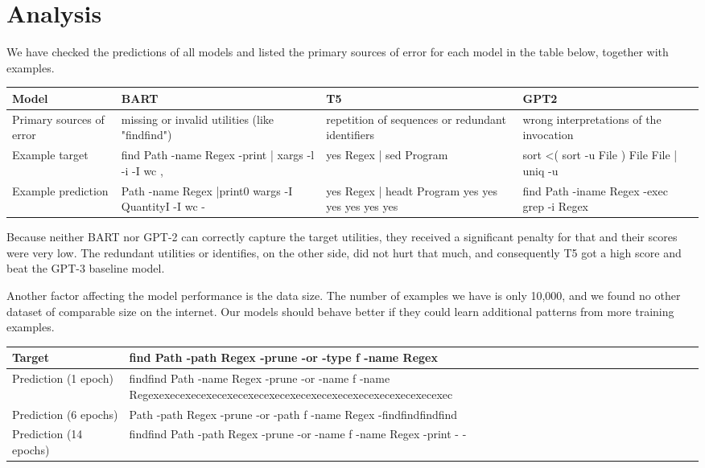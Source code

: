 \section{Analysis}
We have checked the predictions of all models and listed the primary sources of error for each model in the table below, together with examples.


\begin{center}
\begin{tabular}{ |M|L|L|L| } 
  \hline
  Model & BART & T5 & GPT2 \\ 
  \hline
  Primary sources of error & 
  missing or invalid utilities (like "findfind") & 
  repetition of sequences or redundant identifiers & 
  wrong interpretations of the invocation\\ 
  \hline
  Example target & find Path -name Regex -print | xargs -l -i -I {} wc {} {}, & 
  yes Regex | sed Program &
  sort <( sort -u File ) File File | uniq -u \\ 
  \hline
  Example prediction & 
  Path -name Regex |print0 wargs -I QuantityI -I {} wc - & yes Regex | headt Program yes yes yes yes yes yes & 
  find Path -iname Regex -exec grep -i Regex {}\\
  \hline
\end{tabular}
\end{center}

Because neither BART nor GPT-2 can correctly capture the target utilities, they received a significant penalty for that and their scores were very low. The redundant utilities or identifies, on the other side, did not hurt that much, and consequently T5 got a high score and beat the GPT-3 baseline model.

Another factor affecting the model performance is the data size. The number of examples we have is only 10,000, and we found no other dataset of comparable size on the internet. Our models should behave better if they could learn additional patterns from more training examples.

\begin{center}
\begin{tabular}{|M|N|}
    \hline
     Target&  find Path -path Regex -prune -or -type f -name Regex\\
     \hline
     Prediction (1 epoch)&  findfind Path -name Regex -prune -or -name f -name Regexexecexecexecexecexecexecexecexecexecexecexecexecexecexec\\
     \hline
     Prediction (6 epochs)&  Path -path Regex -prune -or -path f -name Regex -findfindfindfind\\
     \hline
     Prediction (14 epochs)& findfind Path -path Regex -prune -or -name f -name Regex -print - -\\
     \hline
\end{tabular}
\end{center}


